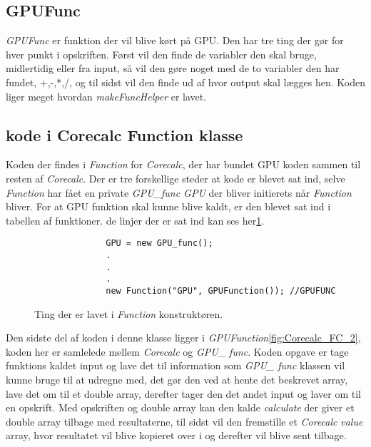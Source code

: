 \subsection{GPUFunc}
\textit{GPUFunc} er funktion der vil blive kørt på GPU. Den har tre ting der gør for hver punkt i opskriften. Først vil den finde de variabler den skal bruge, midlertidig eller fra input, så vil den gøre noget med de to variabler den har fundet, +,-,*,/, og til sidst vil den finde ud af hvor output skal lægges hen. Koden liger meget hvordan \textit{makeFuncHelper} er lavet.


\subsection{kode i Corecalc Function klasse}
Koden der findes i \textit{Function} for \textit{Corecalc}, der har bundet GPU koden sammen til resten af \textit{Corecalc}. Der er tre forskellige steder at kode er blevet sat ind, selve \textit{Function} har fået en private \textit{GPU\_func GPU} der bliver initierets når \textit{Function} bliver. For at GPU funktion skal kunne blive kaldt, er den blevet sat ind i tabellen af funktioner. de linjer der er sat ind kan ses her\ref{fig:Corecalc_FC_1}.

\begin{figure}[!ht]
    \centering
    \lstset{style=sharpc}
	\begin{lstlisting}
              GPU = new GPU_func();
              .
              .
              .
              new Function("GPU", GPUFunction()); //GPUFUNC
	\end{lstlisting}
    \caption{Ting der er lavet i \textit{Function} konstruktøren.}
    \label{fig:Corecalc_FC_1}
\end{figure}


Den sidste del af koden i denne klasse ligger i \textit{GPUFunction}\ref{fig:Corecalc_FC_2}, koden her er samlelede mellem \textit{Corecalc} og \textit{GPU\_ func}. Koden opgave er tage funktions kaldet input og lave det til information som \textit{GPU\_ func} klassen vil kunne bruge til at udregne med, det gør den ved at hente det beskrevet array, lave det om til et double array, derefter tager den det andet input og laver om til en opskrift. Med opskriften og double array kan den kalde \textit{calculate} der giver et double array tilbage med resultaterne, til sidst vil den fremstille et \textit{Corecalc} \textit{value} array, hvor resultatet vil blive kopieret over i og derefter vil blive sent tilbage.

